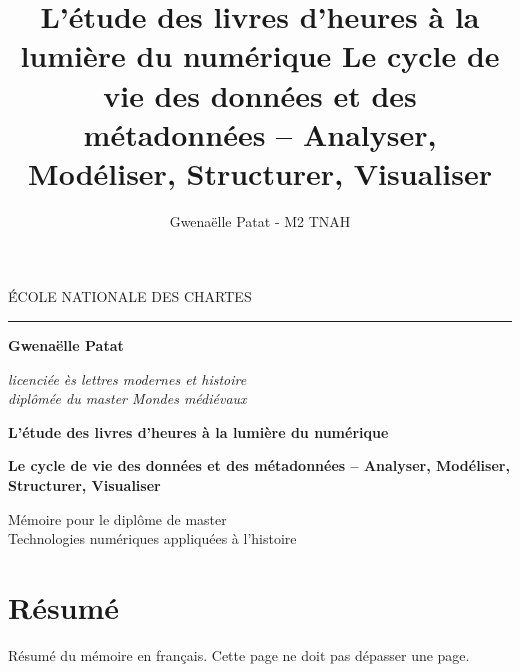 \documentclass[a4paper,12pt,twoside]{book}
\author{Gwenaëlle Patat - M2 TNAH}
\title{L’étude des livres d’heures à la lumière du numérique
Le cycle de vie des données et des métadonnées – Analyser, Modéliser, Structurer, Visualiser}
\begin{document}
	\frontmatter
	\begin{titlepage}
		\begin{center}
			
			\bigskip
			
			\begin{large}
				\'ÉCOLE NATIONALE DES CHARTES
			\end{large}
			\begin{center}\rule{2cm}{0.02cm}\end{center}
			
			\bigskip
			\bigskip
			\bigskip
			\begin{Large}
				\textbf{Gwenaëlle Patat}\\
			\end{Large}
			\begin{normalsize} \textit{licenciée ès lettres modernes et histoire}\\
				\textit{diplômée du master \og{}Mondes médiévaux\fg{}}
			\end{normalsize}
			
			\bigskip
			\bigskip
			\bigskip
			
			\begin{Huge}
				\textbf{L’étude des livres d’heures à la lumière du numérique}\\
			\end{Huge}
			\bigskip
			\bigskip
			\begin{LARGE}
				\textbf{Le cycle de vie des données et des métadonnées – Analyser, Modéliser, Structurer, Visualiser}\\
			\end{LARGE}
			
			\bigskip
			\bigskip
			\bigskip
			\begin{large}
			\end{large}
			\vfill
			
			\begin{large}
				Mémoire 
				pour le diplôme de master \\
				\og{} Technologies numériques appliquées à l'histoire \fg{} \\
			\end{large}
			
		\end{center}
	\end{titlepage}
	
	\thispagestyle{empty}	
	\cleardoublepage
	
	\chapter*{Résumé}
	\medskip
	Résumé du mémoire en français. Cette page ne doit pas dépasser une page.\\
	
\end{document}
